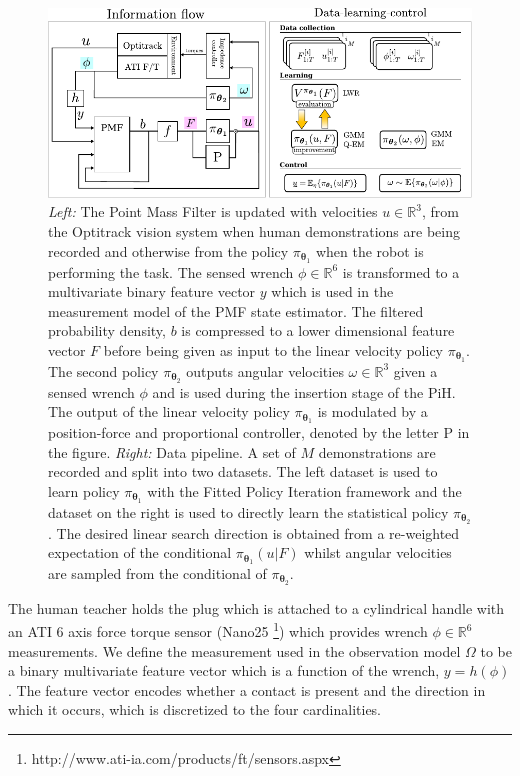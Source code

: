 \documentclass[final,5p,times,twocolumn]{elsarticle}
\newcommand{\Param}{\boldsymbol{\theta}}
\begin{document}
\begin{figure}
\centering
\includegraphics[width=0.9\linewidth]{./Figure/parameters-system-only-two-v2.pdf}
 \caption{\textit{Left:} The Point Mass Filter is updated with velocities $u \in \mathbb{R}^3$, from the 
 Optitrack vision system when human demonstrations are being recorded and otherwise from the policy
 $\pi_{\Param_1}$ when the robot is performing the task. The sensed wrench $\phi \in \mathbb{R}^6$ is transformed to a multivariate binary 
 feature vector $y$ which is used in the measurement model of the PMF state estimator. The filtered probability density, $b$ is 
 compressed to a lower dimensional feature vector $F$ before being given as input to the linear velocity policy $\pi_{\Param_1}$. 
 The second policy $\pi_{\Param_2}$ outputs angular velocities $\omega \in \mathbb{R}^3$ given a sensed wrench $\phi$ and is used during 
 the insertion stage of the PiH. The output of the linear velocity policy $\pi_{\Param_1}$ is modulated by a position-force and 
 proportional controller, denoted by the letter P in the figure.
 \textit{Right:} Data pipeline. A set of $M$ demonstrations are recorded and split into two datasets. The left 
 dataset is used to learn policy $\pi_{\Param_1}$ with the Fitted Policy Iteration framework and the dataset on the right is used 
 to directly learn the statistical policy $\pi_{\Param_2}$. The desired linear search direction is obtained from a re-weighted expectation 
 of the conditional $\pi_{\Param_1}(u|F)$ whilst angular velocities are sampled from the conditional of $\pi_{\Param_2}$.}
 \label{fig:data-flow}
\end{figure}


The human teacher holds the plug which is attached to a cylindrical handle with 
an ATI 6 axis force torque sensor (Nano25 \footnote{http://www.ati-ia.com/products/ft/sensors.aspx}) 
which provides wrench $\phi \in \mathbb{R}^6$ measurements. We define the measurement used in the observation model $\Omega$
to be a binary multivariate feature vector which is a function of the wrench, $y = h(\phi)$. The feature vector encodes whether a contact is present 
and the direction in which it occurs, which is discretized to the four cardinalities.
\end{document}
